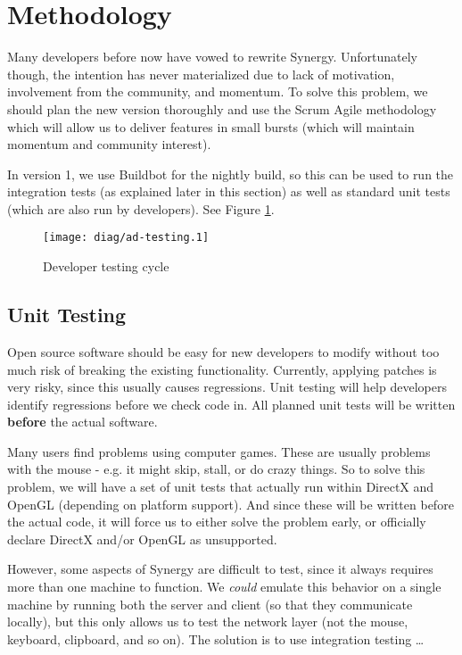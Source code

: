 \section{Methodology}

Many developers before now have vowed to rewrite Synergy. Unfortunately though,
the intention has never materialized due to lack of motivation, involvement from
the community, and momentum.
To solve this problem, we should plan the new version thoroughly and use the
Scrum Agile methodology which will allow us to deliver features in small 
bursts (which will maintain momentum and community interest).

In version 1, we use Buildbot for the nightly build, so this can be used to run
the integration tests (as explained later in this section) as well as standard 
unit tests (which are also run by developers). See Figure \ref{fig:devTesting}.

\begin{figure}[ht!]
  \centering
  \texttt{[image: diag/ad-testing.1]}
  \caption{Developer testing cycle}
  \label{fig:devTesting}
\end{figure}

\subsection{Unit Testing}

Open source software should be easy for new developers to modify without too
much risk of breaking the existing functionality. Currently, applying patches 
is very risky, since this usually causes regressions. Unit testing will help 
developers identify regressions before we check code in. All planned unit tests
will be written \textbf{before} the actual software.

Many users find problems using computer games. These are usually problems with
the mouse - e.g. it might skip, stall, or do crazy things. So to solve this 
problem, we will have a set of unit tests that actually run within DirectX and
OpenGL (depending on platform support). And since these will be written before
the actual code, it will force us to either solve the problem early, or 
officially declare DirectX and/or OpenGL as unsupported.

However, some aspects of Synergy are difficult to test, since it always requires
more than one machine to function. We \textit{could} emulate this behavior on a 
single machine by running both the server and client (so that they communicate 
locally), but this only allows us to test the network layer (not the mouse,
keyboard, clipboard, and so on). The solution is to use integration testing
\ldots


